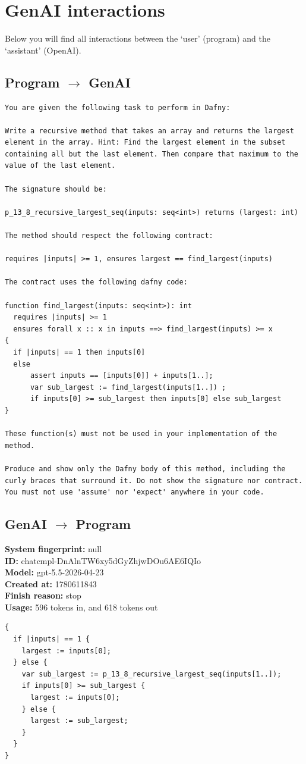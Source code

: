\documentclass{article}
\begin{document}
\section*{GenAI interactions}
Below you will find all interactions between the `user' (program) and the `assistant' (OpenAI).
\subsection*{Program $\rightarrow$ GenAI}
\begin{lstlisting}
You are given the following task to perform in Dafny:

Write a recursive method that takes an array and returns the largest element in the array. Hint: Find the largest element in the subset containing all but the last element. Then compare that maximum to the value of the last element.

The signature should be:

p_13_8_recursive_largest_seq(inputs: seq<int>) returns (largest: int)

The method should respect the following contract:

requires |inputs| >= 1, ensures largest == find_largest(inputs)

The contract uses the following dafny code:

function find_largest(inputs: seq<int>): int
  requires |inputs| >= 1
  ensures forall x :: x in inputs ==> find_largest(inputs) >= x
{
  if |inputs| == 1 then inputs[0]
  else 
      assert inputs == [inputs[0]] + inputs[1..];
      var sub_largest := find_largest(inputs[1..]) ;
      if inputs[0] >= sub_largest then inputs[0] else sub_largest
}

These function(s) must not be used in your implementation of the method.

Produce and show only the Dafny body of this method, including the curly braces that surround it. Do not show the signature nor contract. You must not use 'assume' nor 'expect' anywhere in your code.
\end{lstlisting}
\subsection*{GenAI $\rightarrow$ Program}
\textbf{System fingerprint: }null
\\\textbf{ID: }chatcmpl-DnAlnTW6xy5dGyZhjwDOu6AE6IQIo
\\\textbf{Model: }gpt-5.5-2026-04-23
\\\textbf{Created at: }1780611843
\\\textbf{Finish reason: }stop
\\\textbf{Usage: }596 tokens in, and 618 tokens out
\begin{lstlisting}
{
  if |inputs| == 1 {
    largest := inputs[0];
  } else {
    var sub_largest := p_13_8_recursive_largest_seq(inputs[1..]);
    if inputs[0] >= sub_largest {
      largest := inputs[0];
    } else {
      largest := sub_largest;
    }
  }
}
\end{lstlisting}
\end{document}
